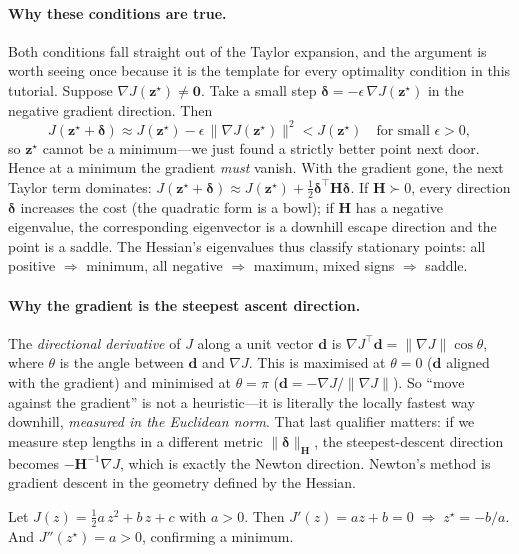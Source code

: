 \documentclass[11pt,twoside]{report}
\theoremstyle{definition}
\theoremstyle{plain}
\theoremstyle{remark}
\newcommand{\0}{\bm{0}}
\begin{document}
\paragraph{Why these conditions are true.}
Both conditions fall straight out of the Taylor expansion, and the
argument is worth seeing once because it is the template for every
optimality condition in this tutorial.
Suppose $\nabla J(\bm{z}^{\star})\ne\0$.
Take a small step $\bm{\delta}=-\epsilon\,\nabla J(\bm{z}^{\star})$
in the negative gradient direction. Then
\begin{equation*}
J(\bm{z}^{\star}+\bm{\delta})
\approx J(\bm{z}^{\star})
-\epsilon\,\|\nabla J(\bm{z}^{\star})\|^{2}
< J(\bm{z}^{\star})
\quad\text{for small }\epsilon>0,
\end{equation*}
so $\bm{z}^{\star}$ cannot be a minimum---we just found a strictly
better point next door. Hence at a minimum the gradient \emph{must}
vanish. With the gradient gone, the next Taylor term dominates:
$J(\bm{z}^{\star}+\bm{\delta})\approx J(\bm{z}^{\star})
+\tfrac12\bm{\delta}^{\!\top}\bm{H}\bm{\delta}$.
If $\bm{H}\succ 0$, every direction $\bm{\delta}$ increases the cost
(the quadratic form is a bowl); if $\bm{H}$ has a negative eigenvalue,
the corresponding eigenvector is a downhill escape direction and the
point is a saddle. The Hessian's eigenvalues thus classify stationary
points: all positive $\Rightarrow$ minimum, all negative $\Rightarrow$
maximum, mixed signs $\Rightarrow$ saddle.

\paragraph{Why the gradient is the steepest ascent direction.}
The \emph{directional derivative} of $J$ along a unit vector $\bm{d}$ is
$\nabla J^{\!\top}\bm{d}=\|\nabla J\|\cos\theta$, where $\theta$ is the
angle between $\bm{d}$ and $\nabla J$. This is maximised at
$\theta=0$ ($\bm{d}$ aligned with the gradient) and minimised at
$\theta=\pi$ ($\bm{d}=-\nabla J/\|\nabla J\|$).
So ``move against the gradient'' is not a heuristic---it is literally
the locally fastest way downhill, \emph{measured in the Euclidean norm}.
That last qualifier matters: if we measure step lengths in a different
metric $\|\bm{\delta}\|_{\bm{H}}$, the steepest-descent direction becomes
$-\bm{H}^{-1}\nabla J$, which is exactly the Newton direction.
Newton's method is gradient descent in the geometry defined by the Hessian.

\begin{examplebox}
Let $J(z)=\tfrac12 a\,z^{2}+b\,z+c$ with $a>0$.
Then $J'(z)=az+b=0\;\Rightarrow\;z^{\star}=-b/a$.
And $J''(z^{\star})=a>0$, confirming a minimum.
\end{examplebox}
\end{document}
